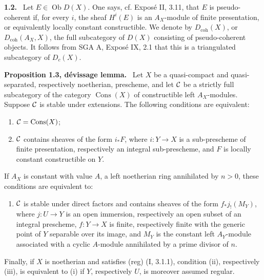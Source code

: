 \documentclass[11pt]{article}
\theoremstyle{plain}
\theoremstyle{definition}
\theoremstyle{remark}
\newenvironment{statement}[1]{\par\medskip\noindent\textbf{#1.}\ }{\par\medskip}
\DeclareMathOperator{\ob}{Ob}
\begin{document}
\begin{statement}{1.2}
Let $E\in\ob D(X)$. One says, cf. Exposé II, 3.11, that $E$ is pseudo-coherent if, for every $i$, the sheaf $H^i(E)$ is an $A_X$-module of finite presentation, or equivalently locally constant constructible. We denote by $D_{\mathrm{coh}}(X)$, or $D_{\mathrm{coh}}(A_X,X)$, the full subcategory of $D(X)$ consisting of pseudo-coherent objects. It follows from SGA A, Exposé IX, 2.1 that this is a triangulated subcategory of $D_c(X)$.
\end{statement}

\begin{statement}{Proposition 1.3, dévissage lemma}
Let $X$ be a quasi-compact and quasi-separated, respectively noetherian, prescheme, and let $\mathcal C$ be a strictly full subcategory of the category $\operatorname{Cons}(X)$ of constructible left $A_X$-modules. Suppose $\mathcal C$ is stable under extensions. The following conditions are equivalent:
\begin{enumerate}[label=(\roman*)]
\item $\mathcal C=\operatorname{Cons}(X)$;
\item $\mathcal C$ contains sheaves of the form $i_*F$, where $i:Y\to X$ is a sub-prescheme of finite presentation, respectively an integral sub-prescheme, and $F$ is locally constant constructible on $Y$.
\end{enumerate}
If $A_X$ is constant with value $A$, a left noetherian ring annihilated by $n>0$, these conditions are equivalent to:
\begin{enumerate}[label=(\roman*)]
\item[(iii)] $\mathcal C$ is stable under direct factors and contains sheaves of the form $f_*j_!(M_Y)$, where $j:U\to Y$ is an open immersion, respectively an open subset of an integral prescheme, $f:Y\to X$ is finite, respectively finite with the generic point of $Y$ separable over its image, and $M_Y$ is the constant left $A_Y$-module associated with a cyclic $A$-module annihilated by a prime divisor of $n$.
\end{enumerate}
Finally, if $X$ is noetherian and satisfies (reg) (I, 3.1.1), condition (ii), respectively (iii), is equivalent to (i) if $Y$, respectively $U$, is moreover assumed regular.
\end{statement}
\end{document}
